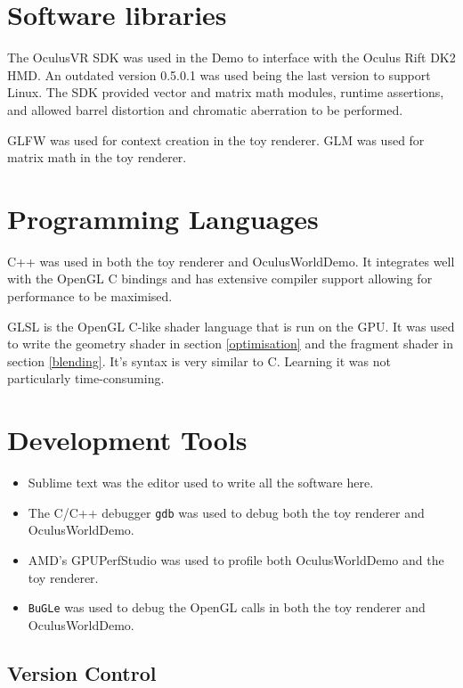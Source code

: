 \documentclass[12pt,a4paper,twoside,openright]{report}
\begin{document}
\section{Software libraries}

The OculusVR SDK was used in the Demo to interface with the Oculus Rift DK2 HMD. An outdated version 0.5.0.1 was used being the last version to support Linux.
The SDK provided vector and matrix math modules, runtime assertions, and allowed barrel distortion and chromatic aberration to be performed.

GLFW was used for context creation in the toy renderer.
GLM was used for matrix math in the toy renderer.

\section{Programming Languages}

C++ was used in both the toy renderer and OculusWorldDemo. It integrates well with the OpenGL C bindings and has extensive compiler support allowing for performance to be maximised.

GLSL is the OpenGL C-like shader language that is run on the GPU. It was used to write the geometry shader in section \ref{optimisation} and the fragment shader in section \ref{blending}. It's syntax is very similar to C. Learning it was not particularly time-consuming.

\section{Development Tools}

\begin{itemize}
\item Sublime text was the editor used to write all the software here.

\item The C/C++ debugger \texttt{gdb} was used to debug both the toy renderer and OculusWorldDemo.

\item AMD's GPUPerfStudio was used to profile both OculusWorldDemo and the toy renderer.

\item \texttt{BuGLe} was used to debug the OpenGL calls in both the toy renderer and OculusWorldDemo.

\end{itemize}
\subsection{Version Control}
\end{document}
